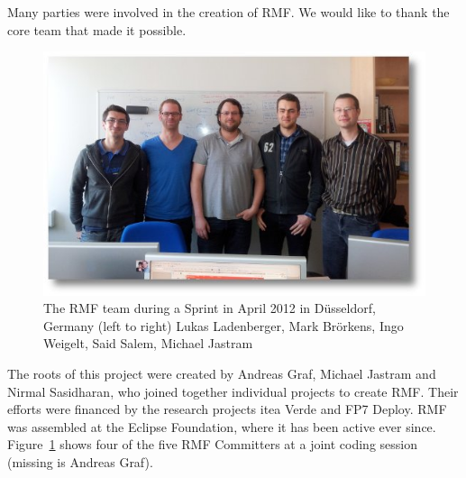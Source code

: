 Many parties were involved in the creation of RMF.  We would like to thank the core team that made it possible.

\begin{figure}[H]
  \centering
  \includegraphics[width=\textwidth]{../rmf-images/2012_03_sprint_team.jpg}
  \caption{The RMF team during a Sprint in April 2012 in Düsseldorf, Germany
  (left to right) Lukas Ladenberger, Mark Brörkens, Ingo Weigelt, Said Salem, Michael Jastram}
  \label{fig:intro_core_team}
\end{figure}


The roots of this project were created by Andreas Graf, Michael Jastram and Nirmal Sasidharan, who joined together individual projects to create RMF.  Their efforts were financed by the research projects itea Verde and FP7 Deploy.  RMF was assembled at the Eclipse Foundation, where it has been active ever since.  Figure~\ref{fig:intro_core_team} shows four of the five RMF Committers at a joint coding session (missing is Andreas Graf).
